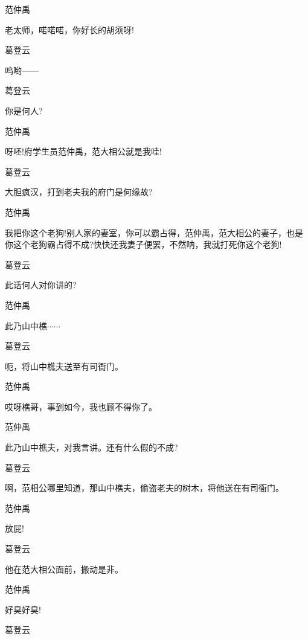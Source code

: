 范仲禹\hspace{20pt}~

老太师，喏喏喏，你好长的胡须呀!

葛登云\hspace{20pt}~

呜哟------

葛登云\hspace{20pt}~

你是何人?

范仲禹\hspace{20pt}~

呀呸!府学生员范仲禹，范大相公就是我哇!

葛登云\hspace{20pt}~

大胆疯汉，打到老夫我的府门是何缘故?

范仲禹

我把你这个老狗!别人家的妻室，你可以霸占得，范仲禹，范大相公的妻子，也是你这个老狗霸占得不成?快快还我妻子便罢，不然呐，我就打死你这个老狗!

葛登云\hspace{20pt}~

此话何人对你讲的?

范仲禹\hspace{20pt}~

此乃山中樵$\cdots{}\cdots{}$

葛登云\hspace{20pt}~

呃，将山中樵夫送至有司衙门。

范仲禹\hspace{20pt}~

哎呀樵哥，事到如今，我也顾不得你了。

范仲禹\hspace{20pt}~

此乃山中樵夫，对我言讲。还有什么假的不成?

葛登云

啊，范相公哪里知道，那山中樵夫，偷盗老夫的树木，将他送在有司衙门。

范仲禹\hspace{20pt}~

放屁!

葛登云\hspace{20pt}~

他在范大相公面前，搬动是非。

范仲禹\hspace{20pt}~

好臭好臭!

葛登云\hspace{20pt}~

